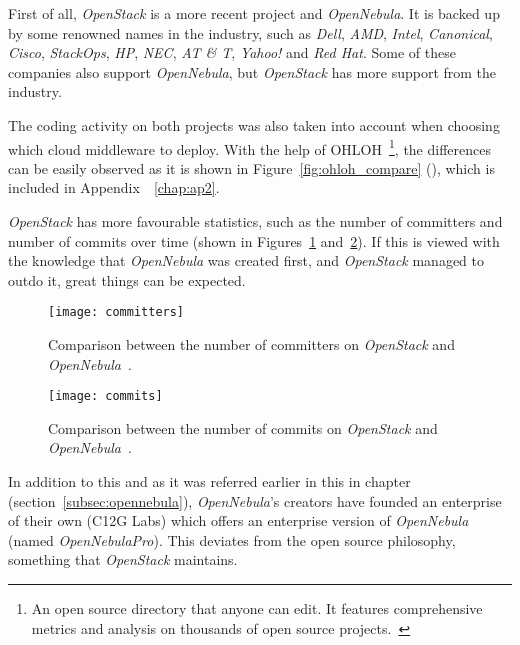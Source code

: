 First of all, \textit{OpenStack} is a more recent project and \textit{OpenNebula}. It is backed up by some renowned names in the industry, such as \textit{Dell}, \textit{AMD}, \textit{Intel}, \textit{Canonical}, \textit{Cisco}, \textit{StackOps}, \textit{HP}, \textit{NEC}, \textit{AT \& T}, \textit{Yahoo!} and \textit{Red Hat}. Some of these companies also support \textit{OpenNebula}, but \textit{OpenStack} has more support from the industry.

The coding activity on both projects was also taken into account when choosing which cloud middleware to deploy. With the help of OHLOH~\footnote{An open source directory that anyone can edit. It features comprehensive metrics and analysis on thousands of open source projects.~\cite{ohloh}}, the differences can be easily observed as it is shown in Figure~\ref{fig:ohloh_compare} (), which is included in Appendix~~\ref{chap:ap2}.

\textit{OpenStack} has more favourable statistics, such as the number of committers and number of commits over time (shown in Figures~\ref{fig:committers} and~\ref{fig:commits}). If this is viewed with the knowledge that \textit{OpenNebula} was created first, and \textit{OpenStack} managed to outdo it, great things can be expected.

\begin{figure}[h]
  \begin{center} 
    \leavevmode 
    \texttt{[image: committers]}
    \caption{Comparison between the number of committers on \textit{OpenStack} and \textit{OpenNebula}~\cite{ohloh}.} 
    \label{fig:committers} 
  \end{center}
\end{figure}

\begin{figure}[h]
  \begin{center}
    \leavevmode
    \texttt{[image: commits]}
    \caption{Comparison between the number of commits on \textit{OpenStack} and \textit{OpenNebula}~\cite{ohloh}.}
    \label{fig:commits}
  \end{center}
\end{figure}

In addition to this and as it was referred earlier in this in chapter (section~\ref{subsec:opennebula}), \textit{OpenNebula}'s creators have founded an enterprise of their own (C12G Labs) which offers an enterprise version of \textit{OpenNebula} (named \textit{OpenNebulaPro}). This deviates from the open source philosophy, something that \textit{OpenStack} maintains.

